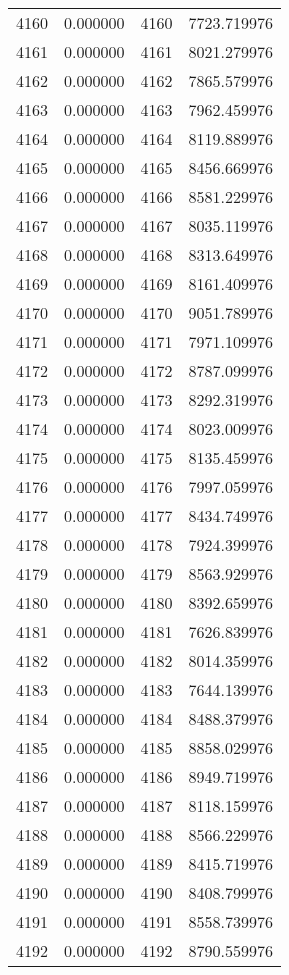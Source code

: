 \documentclass[12pt]{article}
\begin{document}
\begin{longtable}{@{}cccc@{}}
4160 & 0.000000 & 4160 & 7723.719976 \\
4161 & 0.000000 & 4161 & 8021.279976 \\
4162 & 0.000000 & 4162 & 7865.579976 \\
4163 & 0.000000 & 4163 & 7962.459976 \\
4164 & 0.000000 & 4164 & 8119.889976 \\
4165 & 0.000000 & 4165 & 8456.669976 \\
4166 & 0.000000 & 4166 & 8581.229976 \\
4167 & 0.000000 & 4167 & 8035.119976 \\
4168 & 0.000000 & 4168 & 8313.649976 \\
4169 & 0.000000 & 4169 & 8161.409976 \\
4170 & 0.000000 & 4170 & 9051.789976 \\
4171 & 0.000000 & 4171 & 7971.109976 \\
4172 & 0.000000 & 4172 & 8787.099976 \\
4173 & 0.000000 & 4173 & 8292.319976 \\
4174 & 0.000000 & 4174 & 8023.009976 \\
4175 & 0.000000 & 4175 & 8135.459976 \\
4176 & 0.000000 & 4176 & 7997.059976 \\
4177 & 0.000000 & 4177 & 8434.749976 \\
4178 & 0.000000 & 4178 & 7924.399976 \\
4179 & 0.000000 & 4179 & 8563.929976 \\
4180 & 0.000000 & 4180 & 8392.659976 \\
4181 & 0.000000 & 4181 & 7626.839976 \\
4182 & 0.000000 & 4182 & 8014.359976 \\
4183 & 0.000000 & 4183 & 7644.139976 \\
4184 & 0.000000 & 4184 & 8488.379976 \\
4185 & 0.000000 & 4185 & 8858.029976 \\
4186 & 0.000000 & 4186 & 8949.719976 \\
4187 & 0.000000 & 4187 & 8118.159976 \\
4188 & 0.000000 & 4188 & 8566.229976 \\
4189 & 0.000000 & 4189 & 8415.719976 \\
4190 & 0.000000 & 4190 & 8408.799976 \\
4191 & 0.000000 & 4191 & 8558.739976 \\
4192 & 0.000000 & 4192 & 8790.559976 \\

\end{longtable}
\end{document}
